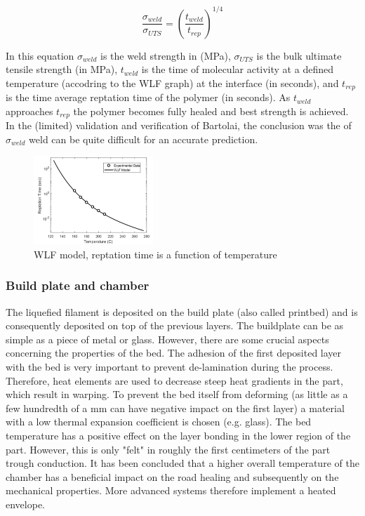 \begin{equation} \label{eq:weld}
\frac{\sigma_{weld}}{\sigma_{UTS}}=\left(\frac{t_{weld}}{t_{rep}}\right)^{1/4}
\end{equation}

In this equation $\sigma_{weld}$ is the weld strength in (MPa), $\sigma_{UTS}$ is the bulk ultimate tensile strength (in MPa), $t_{weld}$ is the time of molecular activity at a defined temperature (accodring to the WLF graph) at the interface (in seconds), and $t_{rep}$ is the time average reptation time of the polymer (in seconds). As $t_{weld}$ approaches $t_{rep}$ the polymer becomes fully healed and best strength is achieved. In the (limited) validation and verification of Bartolai, the conclusion was the of $\sigma_{weld}$ weld can be quite difficult for an accurate prediction.

\begin{figure}[H]
    \centering
    \includegraphics[width=0.4\textwidth]{chapter_2/figures/WLFreptation.PNG}
    \caption{WLF model, reptation time is a function of temperature \cite{Seppala2017WeldManufacturing}}
    \label{fig:WLFreptation}
\end{figure}

\subsubsection{Build plate and chamber}
    \label{Build plate and chamber}
The liquefied filament is deposited on the build plate (also called printbed) and is consequently deposited on top of the previous layers. The buildplate can be as simple as a piece of metal or glass. However, there are some crucial aspects concerning the properties of the bed. The adhesion of the first deposited layer with the bed is very important to prevent de-lamination during the process. Therefore, heat elements are used to decrease steep heat gradients in the part, which result in warping. To prevent the bed itself from deforming (as little as a few hundredth of a mm can have negative impact on the first layer) a material with a low thermal expansion coefficient is chosen (e.g. glass). The bed temperature has a positive effect on the layer bonding in the lower region of the part. However, this is only "felt" in roughly the first centimeters of the part trough conduction. It has been concluded that a higher overall temperature of the chamber has a beneficial impact on the road healing and subsequently on the mechanical properties\cite{VeenEnhancingTemperature}. More advanced systems therefore implement a heated envelope.

